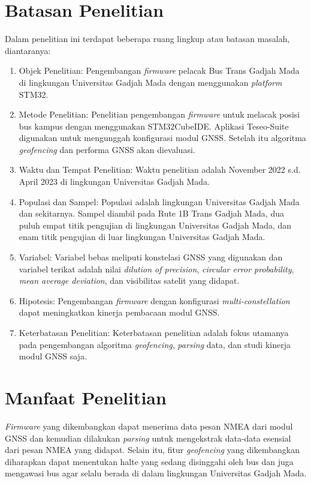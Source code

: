 \section{Batasan Penelitian}
Dalam penelitian ini terdapat beberapa ruang lingkup atau batasan masalah, diantaranya:
\begin{enumerate}
	\item Objek Penelitian: Pengembangan \textit{firmware} pelacak Bus Trans Gadjah Mada di lingkungan Universitas Gadjah Mada dengan menggunakan \textit{platform} STM32.
	\item Metode Penelitian: Penelitian pengembangan \textit{firmware} untuk melacak posisi bus kampus dengan menggunakan STM32CubeIDE. Aplikasi Teseo-Suite digunakan untuk mengunggah konfigurasi modul GNSS. Setelah itu algoritma \textit{geofencing} dan performa GNSS akan dievaluasi.
	\item Waktu dan Tempat Penelitian: Waktu penelitian adalah November 2022 s.d. April 2023 di lingkungan Universitas Gadjah Mada.
	\item Populasi dan Sampel: Populasi adalah lingkungan Universitas Gadjah Mada dan sekitarnya. Sampel diambil pada Rute 1B Trans Gadjah Mada, dua puluh empat titik pengujian di lingkungan Universitas Gadjah Mada, dan enam titik pengujian di luar lingkungan Universitas Gadjah Mada.
	\item Variabel: Variabel bebas meliputi konstelasi GNSS yang digunakan dan variabel terikat adalah nilai \textit{dilution of precision}, \textit{circular error probability}, \textit{mean average deviation}, dan visibilitas satelit yang didapat.
	\item Hipotesis: Pengembangan \textit{firmware} dengan konfigurasi \textit{multi-constellation} dapat meningkatkan kinerja pembacaan modul GNSS.
	\item Keterbatasan Penelitian: Keterbatasan penelitian adalah fokus utamanya pada pengembangan algoritma \textit{geofencing}, \textit{parsing} data, dan studi kinerja modul GNSS saja.
\end{enumerate}

\section{Manfaat Penelitian}
\textit{Firmware} yang dikembangkan dapat menerima data pesan NMEA dari modul GNSS dan kemudian dilakukan \textit{parsing} untuk mengekstrak data-data esensial dari pesan NMEA yang didapat. Selain itu, fitur \textit{geofencing} yang dikembangkan diharapkan dapat menentukan halte yang sedang disinggahi oleh bus dan juga mengawasi bus agar selalu berada di dalam lingkungan Universitas Gadjah Mada.

